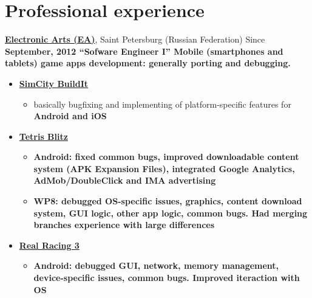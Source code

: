 \section{Professional experience}
{
\fontsize{14pt}{12pt}\selectfont
\href{http://www.ea.com}{\bfseries Electronic Arts (EA)\mdseries},
Saint Petersburg (Russian Federation)
}
\subitem Since \bfseries September, 2012 \mdseries ``Sofware Engineer I''
\subitem Mobile (smartphones and tablets) game apps development: generally porting and debugging.
\begin{itemize}
\setlength{\itemindent}{20pt}
\item
    \href{http://www.ea.com/simcity-buildit}
        {\bfseries SimCity BuildIt\mdseries}
    \begin{itemize}
        \item basically bugfixing and implementing of platform-specific features for \bfseries Android \mdseries and \bfseries iOS\mdseries
    \end{itemize}
\item
    \href{http://www.tetrisblitz.com}
        {\bfseries Tetris Blitz \mdseries}
    \begin{itemize}
        \item \bfseries Android\mdseries:
        fixed common bugs,
        improved downloadable content system (APK Expansion Files),
        integrated Google Analytics, AdMob/DoubleClick and IMA advertising
    \end{itemize}
    \begin{itemize}
        \item \bfseries WP8\mdseries:
        debugged OS-specific issues,
        graphics,
        content download system,
        GUI logic,
        other app logic,
        common bugs.
        Had merging branches experience with large differences
    \end{itemize}
\item
    \href{http://firemonkeys.com.au/downloadR3}
    {\bfseries Real Racing 3\mdseries}
    \begin{itemize}
        \item\bfseries Android\mdseries:
        debugged GUI,
        network,
        memory management,
        device-specific issues,
        common bugs.
        Improved iteraction with OS
    \end{itemize}
\end{itemize}

